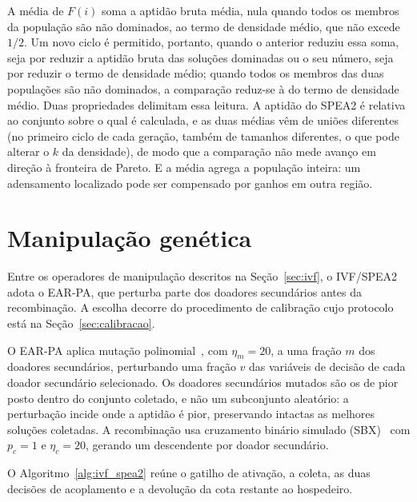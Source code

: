 A média de $F(i)$ soma a aptidão bruta média, nula quando todos os membros da população são não dominados, ao termo de densidade médio, que não excede $1/2$. Um novo ciclo é permitido, portanto, quando o anterior reduziu essa soma, seja por reduzir a aptidão bruta das soluções dominadas ou o seu número, seja por reduzir o termo de densidade médio; quando todos os membros das duas populações são não dominados, a comparação reduz-se à do termo de densidade médio. Duas propriedades delimitam essa leitura. A aptidão do SPEA2 é relativa ao conjunto sobre o qual é calculada, e as duas médias vêm de uniões diferentes (no primeiro ciclo de cada geração, também de tamanhos diferentes, o que pode alterar o $k$ da densidade), de modo que a comparação não mede avanço em direção à fronteira de Pareto. E a média agrega a população inteira: um adensamento localizado pode ser compensado por ganhos em outra região.

\section{Manipulação genética}
\label{sec:manipulacao}

Entre os operadores de manipulação descritos na Seção~\ref{sec:ivf}, o IVF/SPEA2 adota o EAR-PA, que perturba parte dos doadores secundários antes da recombinação. A escolha decorre do procedimento de calibração cujo protocolo está na Seção~\ref{sec:calibracao}.

O EAR-PA aplica mutação polinomial~\cite{deb2014analysing}, com $\eta_m = 20$, a uma fração $m$ dos doadores secundários, perturbando uma fração $v$ das variáveis de decisão de cada doador secundário selecionado. Os doadores secundários mutados são os de pior posto dentro do conjunto coletado, e não um subconjunto aleatório: a perturbação incide onde a aptidão é pior, preservando intactas as melhores soluções coletadas. A recombinação usa cruzamento binário simulado (SBX)~\cite{deb1995simulated} com $p_c = 1$ e $\eta_c = 20$, gerando um descendente por doador secundário.

O Algoritmo~\ref{alg:ivf_spea2} reúne o gatilho de ativação, a coleta, as duas decisões de acoplamento e a devolução da cota restante ao hospedeiro.

